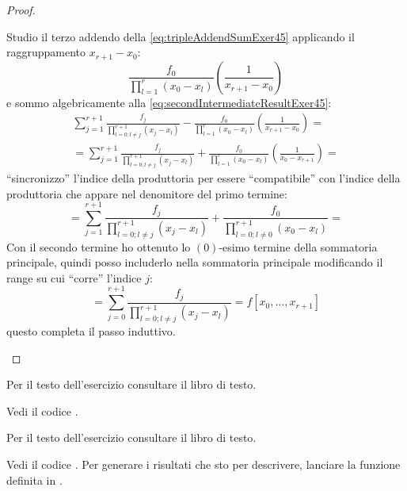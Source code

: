 \begin{proof}
\begin{enumerate}
\begin{itemize}
  	Studio il terzo addendo della \ref{eq:tripleAddendSumExer45} applicando il
  	raggruppamento $x_{r+1} - x_{0}$: 
  	\begin{displaymath}
  	\frac{f_{0}}{\prod_{l = 1}^{r}{(x_{0} - x_{l})}}  \left(\frac{1}{x_{r+1}
  	- x_{0}}\right)
  	\end{displaymath}
  	e sommo algebricamente alla \ref{eq:secondIntermediateResultExer45}:
  	\begin{displaymath}
  	\begin{split}
	  	\sum_{j = 1}^{r+1}{
	  		\frac{f_{j}}{\prod_{l = 0;l \not = j}^{r+1}{(x_{j} -
	  		x_{l})}}} -
	  	\frac{f_{0}}{\prod_{l = 1}^{r}{(x_{0} - x_{l})}}  \left(\frac{1}{x_{r+1}
	  	- x_{0}}\right) =	  	\\
	  	= \sum_{j = 1}^{r+1}{
	  		\frac{f_{j}}{\prod_{l = 0;l \not = j}^{r+1}{(x_{j} -
	  		x_{l})}}} +
	  	\frac{f_{0}}{\prod_{l = 1}^{r}{(x_{0} - x_{l})}}  \left(\frac{1}{x_{0}
	  	- x_{r+1}}\right) = 
  	\end{split}
  	\end{displaymath}
  	``sincronizzo'' l'indice della produttoria per essere ``compatibile'' 
  	con l'indice della produttoria che appare nel denomitore del primo termine:
  	\begin{displaymath}
	  	= \sum_{j = 1}^{r+1}{
	  		\frac{f_{j}}{\prod_{l = 0;l \not = j}^{r+1}{(x_{j} -
	  		x_{l})}}} +
	  	\frac{f_{0}}{\prod_{l = 0;l\not = 0}^{r+1}{(x_{0} - x_{l})}} = 
  	\end{displaymath}
  	Con il secondo termine ho ottenuto lo $(0)$-esimo termine della sommatoria
  	principale, quindi posso includerlo nella sommatoria principale
  	modificando il range su cui ``corre'' l'indice $j$:
  	\begin{equation}
  	\label{eq:thirdIntermediateResultExer45} 
  		= \sum_{j = 0}^{r+1}{
	  		\frac{f_{j}}{\prod_{l = 0;l \not = j}^{r+1}{(x_{j} -
	  		x_{l})}}} = f[x_{0}, \ldots, x_{r+1}]
	\end{equation}
  	questo completa il passo induttivo.
  \end{itemize}
\end{enumerate}
\end{proof}

\begin{exercise}[4.6]
Per il testo dell'esercizio consultare il libro di testo.
\end{exercise}
Vedi il codice .

\begin{exercise}[4.7]
Per il testo dell'esercizio consultare il libro di testo.
\end{exercise}
Vedi il codice . Per generare i risultati
che sto per descrivere, lanciare la funzione definita in
.

